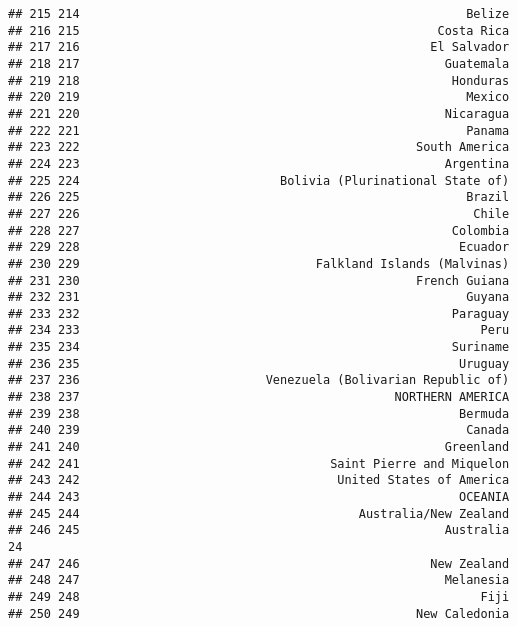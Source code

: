 \documentclass[]{article}
\begin{document}
\begin{verbatim}
## 215 214                                                      Belize   
## 216 215                                                  Costa Rica   
## 217 216                                                 El Salvador   
## 218 217                                                   Guatemala   
## 219 218                                                    Honduras   
## 220 219                                                      Mexico   
## 221 220                                                   Nicaragua   
## 222 221                                                      Panama   
## 223 222                                               South America   
## 224 223                                                   Argentina   
## 225 224                            Bolivia (Plurinational State of)   
## 226 225                                                      Brazil   
## 227 226                                                       Chile   
## 228 227                                                    Colombia   
## 229 228                                                     Ecuador   
## 230 229                                 Falkland Islands (Malvinas)   
## 231 230                                               French Guiana   
## 232 231                                                      Guyana   
## 233 232                                                    Paraguay   
## 234 233                                                        Peru   
## 235 234                                                    Suriname   
## 236 235                                                     Uruguay   
## 237 236                          Venezuela (Bolivarian Republic of)   
## 238 237                                            NORTHERN AMERICA   
## 239 238                                                     Bermuda   
## 240 239                                                      Canada   
## 241 240                                                   Greenland   
## 242 241                                   Saint Pierre and Miquelon   
## 243 242                                    United States of America   
## 244 243                                                     OCEANIA   
## 245 244                                       Australia/New Zealand   
## 246 245                                                   Australia 24
## 247 246                                                 New Zealand   
## 248 247                                                   Melanesia   
## 249 248                                                        Fiji   
## 250 249                                               New Caledonia   

\end{verbatim}
\end{document}
